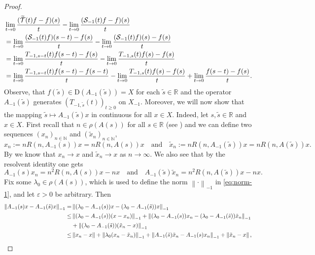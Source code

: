 \documentclass[a4paper,oneside,10pt]{amsart}
\theoremstyle{definition}
\numberwithin{equation}{section}
\def\dom{\mathrm{D}}
\def\NN{\mathbb{N}}
\def\RR{\mathbb{R}}
\begin{document}
{\begin{proof}
\begin{align}
&\lim_{t\to0}{\frac{(\widetilde{\mathcal{T}}(t)f-f)(s)}{t}}-\lim_{t\to0}{\frac{(\mathcal{S}_{-1}(t)f-f)(s)}{t}}\notag \\
&=\lim_{t\to0}{\frac{({\mathcal{S}}_{-1}(t)f)(s-t)-f(s)}{t}}-\lim_{t\to0}{\frac{(\mathcal{S}_{-1}(t)f)(s)-f(s)}{t}}\notag \\
&=\lim_{t\to0}{\frac{T_{-1,s-t}(t)f(s-t)-f(s)}{t}}-\lim_{t\to0}{\frac{T_{-1,s}(t)f(s)-f(s)}{t}}\notag \\
&=\lim_{t\to0}{\frac{T_{-1,s-t}(t)f(s-t)-f(s-t)}{t}} -\lim_{t\to0}{\frac{T_{-1,s}(t)f(s)-f(s)}{t}} + \lim_{t\to0}{\frac{f(s-t)-f(s)}{t}}.\label{eq:last}
\end{align}
Observe, that $f(\tilde{s}) \in \dom(A_{-1}(\tilde{s}))=X$ for each $\tilde{s}\in\RR$ and the operator $A_{-1}(\tilde{s})$ generates $(T_{-1,\tilde{s}}(t))_{t\geq0}$ on $X_{-1}$. {Moreover,  we will now show that the mapping $\tilde{s}\mapsto A_{-1}(\tilde{s})x$ in continuous for all $x\in X$. Indeed, let $s,\tilde{s}\in\RR$ and $x\in X$. First recall that $n\in\rho(A(s))$ for all $s\in\RR$  (see \cite[Cor.~18.13]{BKR2017}) and we can define two sequences $(x_n)_{n\in\NN}$ and $(\tilde{x}_n)_{n\in\NN}$,
\[
x_n:=nR(n,A_{-1}(s))x=nR(n,A(s))x\quad\text{and}\quad\tilde{x}_n:=nR(n,A_{-1}(\tilde{s}))x=nR(n,A(\tilde{s}))x.
\]
By \cite[Lem.~II.3.4(i)]{EN} we know that $x_n\to x$ and $\tilde{x}_n\to x$ as $n\to\infty$. We also see that by the resolvent identity one gets
\begin{equation}\label{eq:res}
A_{-1}(s)x_n=n^2R(n,A(s))x-nx\quad\text{and}\quad A_{-1}(\tilde{s})\tilde{x}_n=n^2R(n,A(\tilde{s}))x-nx.
\end{equation}
Fix some $\lambda_0\in\rho(A(s))$, which is used to define the norm $\left\|\cdot\right\|_{-1}$ in \eqref{eq:norm-1}, and let $\varepsilon>0$ be arbitrary. Then
\begin{align}
\left\|A_{-1}(s)x-A_{-1}(\tilde{s})x\right\|_{-1} =&\left\|(\lambda_0-A_{-1}(s))x-(\lambda_0-A_{-1}(\tilde{s}))x\right\|_{-1} \notag \\
\leq &\left\|(\lambda_0-A_{-1}(s))(x-x_n)\right\|_{-1}+\left\|(\lambda_0-A_{-1}(s))x_n-(\lambda_0-A_{-1}(\tilde{s}))\tilde{x}_n\right\|_{-1} \notag \\
& +\left\|(\lambda_0-A_{-1}(\tilde{s}))(\tilde{x}_n-x)\right\|_{-1} \notag\\
\leq&\left\|x_n-x\right\|+\left\|\lambda_0(x_n-\tilde{x}_n)\right\|_{-1}+\left\|A_{-1}(\tilde{s})\tilde{x}_n-A_{-1}(s)x_n\right\|_{-1}+\left\|\tilde{x}_n-x\right\|,\label{eq:epsilon/4}

\end{align}}
\end{proof}}
\end{document}

